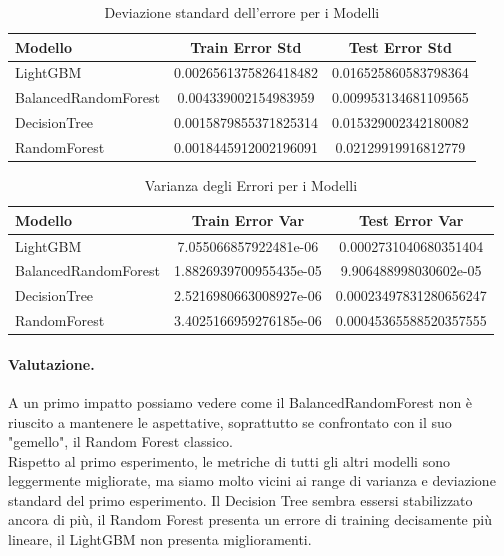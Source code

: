 \begin{table}[H]
    \centering
    \begin{tabular}{lcc}
    \toprule
    \textbf{Modello} & \textbf{Train Error Std} & \textbf{Test Error Std} \\
    \midrule
    LightGBM & 0.0026561375826418482 & 0.016525860583798364 \\
    BalancedRandomForest & 0.004339002154983959 & 0.009953134681109565\\
    DecisionTree & 0.0015879855371825314 & 0.015329002342180082 \\
    RandomForest & 0.0018445912002196091 & 0.02129919916812779 \\
    \bottomrule
    \end{tabular}
    \caption{Deviazione standard dell'errore per i Modelli}
\end{table}


\begin{table}[H]
    \centering
    \begin{tabular}{lcc}
    \toprule
    \textbf{Modello} & \textbf{Train Error Var} & \textbf{Test Error Var} \\
    \midrule
    LightGBM & 7.055066857922481e-06 & 0.0002731040680351404 \\
    BalancedRandomForest & 1.8826939700955435e-05 & 9.906488998030602e-05 \\
    DecisionTree & 2.5216980663008927e-06 & 0.00023497831280656247 \\
    RandomForest & 3.4025166959276185e-06 & 0.00045365588520357555 \\
    \bottomrule
    \end{tabular}
    \caption{Varianza degli Errori per i Modelli}
\end{table}

\paragraph{Valutazione.} A un primo impatto possiamo vedere come il BalancedRandomForest non è riuscito a mantenere le aspettative, soprattutto se confrontato con il suo "gemello", il Random Forest classico. \\ Rispetto al primo esperimento, le metriche di tutti gli altri modelli sono leggermente migliorate, ma siamo molto vicini ai range di varianza e deviazione standard del primo esperimento. Il Decision Tree sembra essersi stabilizzato ancora di più, il Random Forest presenta un errore di training decisamente più lineare, il LightGBM non presenta miglioramenti.

